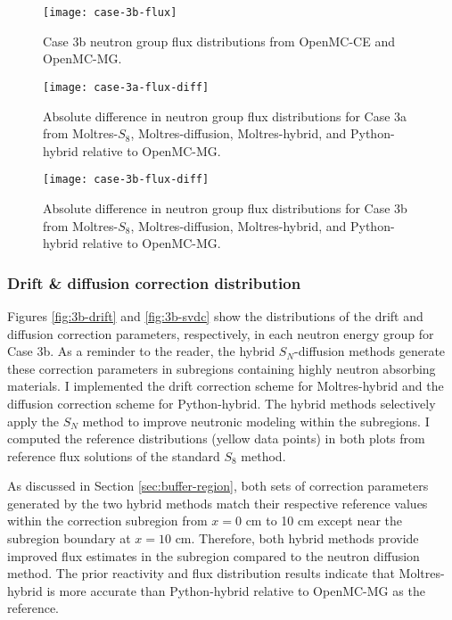 \begin{figure}[htb!]
  \centering
  \texttt{[image: case-3b-flux]}
  \caption{Case 3b neutron group flux distributions from OpenMC-CE and OpenMC-MG.}
  \label{fig:3b-flux}
\end{figure}

\begin{figure}[htb!]
  \centering
  \texttt{[image: case-3a-flux-diff]}
  \caption{Absolute difference in neutron group flux distributions for Case 3a from Moltres-$S_8$,
  Moltres-diffusion, Moltres-hybrid, and Python-hybrid relative to OpenMC-MG.}
  \label{fig:3a-flux-diff}
\end{figure}

\begin{figure}[htb!]
  \centering
  \texttt{[image: case-3b-flux-diff]}
  \caption{Absolute difference in neutron group flux distributions for Case 3b from Moltres-$S_8$,
  Moltres-diffusion, Moltres-hybrid, and Python-hybrid relative to OpenMC-MG.}
  \label{fig:3b-flux-diff}
\end{figure}

\FloatBarrier

\subsubsection{Drift \& diffusion correction distribution}

Figures \ref{fig:3b-drift} and \ref{fig:3b-svdc} show the distributions of the drift and diffusion
correction parameters, respectively, in each neutron energy group for Case 3b. As a reminder to the
reader, the hybrid $S_N$-diffusion methods generate these correction parameters in subregions
containing highly neutron absorbing materials. I implemented the drift correction scheme for
Moltres-hybrid and the diffusion correction scheme for Python-hybrid. The hybrid methods
selectively apply the $S_N$ method to improve neutronic modeling within the subregions. I computed
the reference distributions (yellow data points) in both plots from reference flux solutions of the
standard $S_8$ method.

As discussed in Section \ref{sec:buffer-region}, both sets of correction parameters generated by
the two hybrid methods match their respective reference values within the correction subregion from
$x=0$ cm to 10 cm except near the subregion boundary at $x=10$ cm. Therefore, both hybrid methods
provide improved flux estimates in the subregion compared to the neutron diffusion method.
The prior reactivity and flux distribution results indicate that Moltres-hybrid is more accurate
than Python-hybrid relative to OpenMC-MG as the reference.

